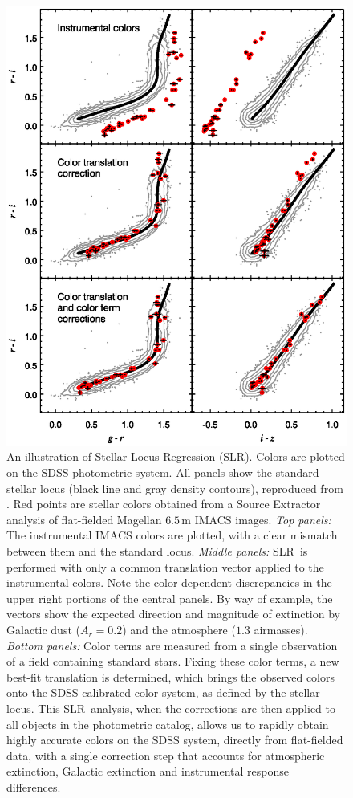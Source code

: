 \documentclass{report}
\newcommand{\sdss}{SDSS}
\newcommand{\slr}{SLR}
\begin{document}
\begin{figure}
  \center
 \includegraphics[scale=0.6]{fig/illus_sptcl2332_5051_locus_threepanel.eps}
 \caption{ An illustration of Stellar Locus Regression (\slr).  Colors
   are plotted on the SDSS photometric system. All panels show the
   standard stellar locus (black line and gray density contours),
   reproduced from \citet{bib:covey}.  Red points are stellar colors
   obtained from a Source Extractor analysis of flat-fielded Magellan
   $6.5\,\mathrm{m}$ IMACS images.  {\it Top panels:} The instrumental
   IMACS colors are plotted, with a clear mismatch between them and
   the standard locus. {\it Middle panels:} \slr\ is performed with
   only a common translation vector applied to the instrumental
   colors.  Note the color-dependent discrepancies in the upper right
   portions of the central panels.  By way of example, the vectors
   show the expected direction and magnitude of extinction by Galactic
   dust ($A_r=0.2$) and the atmosphere ($1.3$ airmasses).  {\it Bottom
     panels:} Color terms are measured from a single observation of a
   field containing standard stars. Fixing these color terms, a new
   best-fit translation is determined, which brings the observed
   colors onto the \sdss-calibrated color system, as defined by the
   stellar locus.  This \slr\ analysis, when the corrections are then
   applied to all objects in the photometric catalog, allows us to
   rapidly obtain highly accurate colors on the SDSS system, directly
   from flat-fielded data, with a single correction step that accounts
   for atmospheric extinction, Galactic extinction and instrumental
   response differences.}
 \label{fig:example}
 \end{figure}
\end{document}

